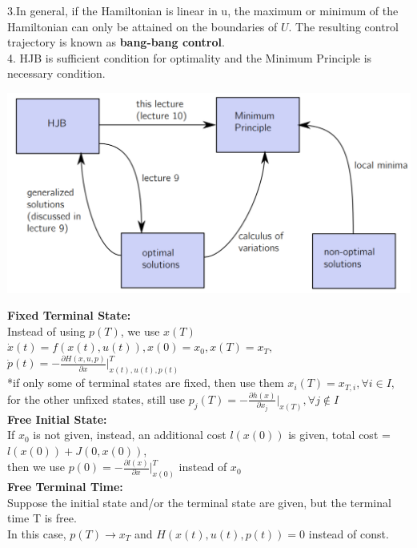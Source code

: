 \documentclass[10pt,landscape]{article}
\newenvironment{Figure}
{\par\medskip\noindent\minipage{\linewidth}}
{\endminipage\par\medskip}
\begin{document}
\begin{multicols*}{4}
3.In general, if the Hamiltonian is linear in u, the maximum or minimum of the
Hamiltonian can only be attained on the boundaries of $U$. The resulting control trajectory is known as \textbf{bang-bang control}.\\

4. HJB is sufficient condition for optimality and the Minimum Principle is necessary condition.\\

\begin{Figure}
	\centering
	\includegraphics[width=\linewidth]{pictures/MP2.png}
\end{Figure}


\textbf{Fixed Terminal State:}\\
Instead of using $p(T)$, we use $x(T)$\\
$\dot{x}(t) = f(x(t),u(t)), x(0)=x_0, x(T)=x_T,$ \\
$ \dot{p}(t) = - \frac{\partial H(x,u,p)}{\partial x}|^T_{x(t),u(t),p(t)}$\\
*if only some of terminal states are fixed, then use them $x_i(T) = x_{T,i} , \forall i \in I$, for the other unfixed states, still use $p_j(T) = - \frac{\partial h(x)}{\partial x_j}|_{x(T)}, \forall j \notin I$\\

\textbf{Free Initial State:}\\
If $x_0$ is not given, instead, an additional cost $l(x(0))$ is given, total cost = $l(x(0)) + J(0,x(0))$, \\
then we use $p(0) = -\frac{\partial l(x)}{\partial x}|^T_{x(0)} $ instead of  $x_0$\\

\textbf{Free Terminal Time:}\\
Suppose the initial state and/or the terminal state are given, but the terminal time T is free.\\
In this case, $p(T) \rightarrow x_T$ and $H(x(t),u(t),p(t))=0$ instead of const.\\


\end{multicols*}
\end{document}
